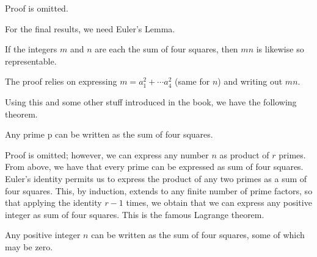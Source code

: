Proof is omitted.

For the final results, we need Euler's Lemma.

\begin{theorem}
	If the integers $m$ and $n$ are each the sum of four squares, then $mn$ is likewise so representable.
\end{theorem}

The proof relies on expressing $m = a_1^2 + \cdots a_4^2$ (same for $n$) and writing out $mn$.

Using this and some other stuff introduced in the book, we have the following theorem.

\begin{theorem}
	Any prime p can be written as the sum of four squares.
\end{theorem}

Proof is omitted; however, we can express any number $n$ as product of $r$ primes. From above, we have that every prime can be expressed as sum of four squares. Euler's identity permits us to express the product of any two primes as a sum of four squares. This, by induction, extends to any finite number of prime factors, so that applying the identity $r - 1$ times, we obtain that we can express any positive integer as sum of four squares. This is the famous Lagrange theorem.

\begin{theorem}
Any positive integer $n$ can be written as the sum of four squares, some of which may be zero.
\end{theorem}




